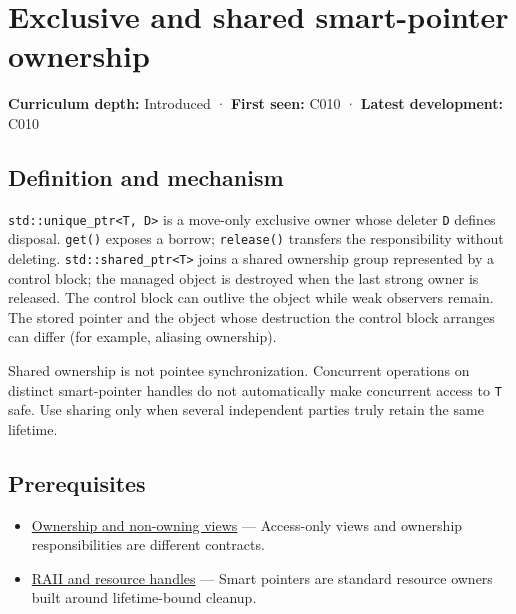 \hypertarget{appendix-51602cabe815}{}\label{referencestart:appendix-51602cabe815}
\section{Exclusive and shared smart-pointer ownership}\label{appendix-51602cabe815-exclusive-and-shared-smart-pointer-ownership}

\textbf{Curriculum depth:} Introduced · \textbf{First seen:} C010 · \textbf{Latest development:} C010

\subsection{Definition and mechanism}\label{appendix-51602cabe815-definition-and-mechanism}

\texttt{std::unique\_ptr\textless{}T,\ D\textgreater{}} is a move-only exclusive owner whose deleter \texttt{D} defines disposal. \texttt{get()} exposes a borrow; \texttt{release()} transfers the responsibility without deleting. \texttt{std::shared\_ptr\textless{}T\textgreater{}} joins a shared ownership group represented by a control block; the managed object is destroyed when the last strong owner is released. The control block can outlive the object while weak observers remain. The stored pointer and the object whose destruction the control block arranges can differ (for example, aliasing ownership).

Shared ownership is not pointee synchronization. Concurrent operations on distinct smart-pointer handles do not automatically make concurrent access to \texttt{T} safe. Use sharing only when several independent parties truly retain the same lifetime.

\subsection{Prerequisites}\label{appendix-51602cabe815-prerequisites}

\begin{itemize}
\tightlist
\item
  \hyperref[appendix-d52e4486f527]{Ownership and non-owning views} --- Access-only views and ownership responsibilities are different contracts.
\item
  \hyperref[appendix-69739d3ab49b]{RAII and resource handles} --- Smart pointers are standard resource owners built around lifetime-bound cleanup.
\end{itemize}

